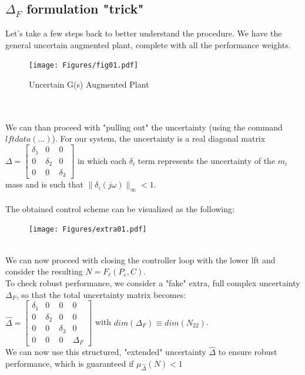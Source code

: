 \documentclass[a4paper, 12pt]{article}
\def\FigureOne{\centering\texttt{[image: Figures/fig01.pdf]}}
\begin{document}
\subsection{$\Delta_F$ formulation "trick"}
Let's take a few steps back to better understand the procedure. 
We have the general uncertain augmented plant, complete with all the performance weights.
\begin{figure}[h!]
    \FigureOne
    \caption{Uncertain G(s) Augmented Plant}
    \label{fig:fig01}
\end{figure}
\\\\ We can than proceed with "pulling out" the uncertainty (using the command $lftdata(...)$). For our system, the uncertainty is a real diagonal matrix \\
$\Delta = \begin{bmatrix}
\delta_1 & 0 & 0\\
0 & \delta_2 & 0\\
0 & 0 & \delta_3
\end{bmatrix}$ in which each $\delta_i$ term represents the uncertainty of the $m_i$ mass and is such that $\|\delta_i(j\omega)\|_\infty < 1$. 
\\\\
The obtained control scheme can be visualized as the following:
\begin{figure}[h!]
\centering
\texttt{[image: Figures/extra01.pdf]}
\end{figure}\\
We can now proceed with closing the controller loop with the lower lft and consider the resulting $N = F_\ell (P_e,C)$. \\
To check robust performance, we consider a "fake" extra, full complex uncertainty $\Delta_F$, so that the total uncertainty matrix becomes:
\\$\hat{\Delta} = \begin{bmatrix}
\delta_1 & 0 & 0 & 0\\
0 & \delta_2 & 0 & 0\\
0 & 0 & \delta_3 & 0 \\
0 & 0 & 0 & \Delta_F
\end{bmatrix}$ with $dim(\Delta_F) \equiv dim(N_{22})$.
\\
We can now use this structured, "extended" uncertainty $\hat{\Delta}$ to ensure robust performance, which is guaranteed if $\mu_{\hat{\Delta}}(N) < 1$ 
\end{document}
